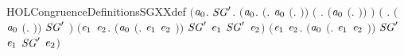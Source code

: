 \begin{SaveVerbatim}{HOLCongruenceDefinitionsSGXXdef}
\HOLTokenTurnstile{}  \HOLSymConst{\ensuremath{=}}
   \ensuremath{(}\HOLTokenLambda{}\ensuremath{\HOLBoundVar{a}\sb{\mathrm{0}}}.
        \HOLSymConst{\HOLTokenForall{}}\ensuremath{\HOLBoundVar{SG}\sp{\prime}}.
            \ensuremath{(}\HOLSymConst{\HOLTokenForall{}}\ensuremath{\HOLBoundVar{a}\sb{\mathrm{0}}}.
                 \ensuremath{(}\HOLSymConst{\HOLTokenExists{}}. \ensuremath{\HOLBoundVar{a}\sb{\mathrm{0}}} \HOLSymConst{\ensuremath{=}} \ensuremath{(}\HOLTokenLambda{}. \ensuremath{)}\ensuremath{)} \HOLSymConst{\HOLTokenDisj{}}
                 \ensuremath{(}\HOLSymConst{\HOLTokenExists{}} . \ensuremath{(}\ensuremath{\HOLBoundVar{a}\sb{\mathrm{0}}} \HOLSymConst{\ensuremath{=}} \ensuremath{(}\HOLTokenLambda{}.  \HOLSymConst{\ensuremath{\ldotp}} \ensuremath{)}\ensuremath{)} \HOLSymConst{\HOLTokenConj{}}  \ensuremath{)} \HOLSymConst{\HOLTokenDisj{}}
                 \ensuremath{(}\HOLSymConst{\HOLTokenExists{}} . \ensuremath{(}\ensuremath{\HOLBoundVar{a}\sb{\mathrm{0}}} \HOLSymConst{\ensuremath{=}} \ensuremath{(}\HOLTokenLambda{}. \HOLSymConst{\ensuremath{\ldotp}} \ensuremath{)}\ensuremath{)} \HOLSymConst{\HOLTokenConj{}} \ensuremath{\HOLBoundVar{SG}\sp{\prime}} \ensuremath{)} \HOLSymConst{\HOLTokenDisj{}}
                 \ensuremath{(}\HOLSymConst{\HOLTokenExists{}}\ensuremath{\HOLBoundVar{e}\sb{\mathrm{1}}} \ensuremath{\HOLBoundVar{e}\sb{\mathrm{2}}}.
                      \ensuremath{(}\ensuremath{\HOLBoundVar{a}\sb{\mathrm{0}}} \HOLSymConst{\ensuremath{=}} \ensuremath{(}\HOLTokenLambda{}. \ensuremath{\HOLBoundVar{e}\sb{\mathrm{1}}}  \HOLSymConst{\ensuremath{+}} \ensuremath{\HOLBoundVar{e}\sb{\mathrm{2}}} \ensuremath{)}\ensuremath{)} \HOLSymConst{\HOLTokenConj{}} \ensuremath{\HOLBoundVar{SG}\sp{\prime}} \ensuremath{\HOLBoundVar{e}\sb{\mathrm{1}}} \HOLSymConst{\HOLTokenConj{}} \ensuremath{\HOLBoundVar{SG}\sp{\prime}} \ensuremath{\HOLBoundVar{e}\sb{\mathrm{2}}}\ensuremath{)} \HOLSymConst{\HOLTokenDisj{}}
                 \ensuremath{(}\HOLSymConst{\HOLTokenExists{}}\ensuremath{\HOLBoundVar{e}\sb{\mathrm{1}}} \ensuremath{\HOLBoundVar{e}\sb{\mathrm{2}}}.
                      \ensuremath{(}\ensuremath{\HOLBoundVar{a}\sb{\mathrm{0}}} \HOLSymConst{\ensuremath{=}} \ensuremath{(}\HOLTokenLambda{}. \ensuremath{\HOLBoundVar{e}\sb{\mathrm{1}}}  \HOLSymConst{\ensuremath{\mid}} \ensuremath{\HOLBoundVar{e}\sb{\mathrm{2}}} \ensuremath{)}\ensuremath{)} \HOLSymConst{\HOLTokenConj{}} \ensuremath{\HOLBoundVar{SG}\sp{\prime}} \ensuremath{\HOLBoundVar{e}\sb{\mathrm{1}}} \HOLSymConst{\HOLTokenConj{}} \ensuremath{\HOLBoundVar{SG}\sp{\prime}} \ensuremath{\HOLBoundVar{e}\sb{\mathrm{2}}}\ensuremath{)} \HOLSymConst{\HOLTokenDisj{}}

\end{SaveVerbatim}

